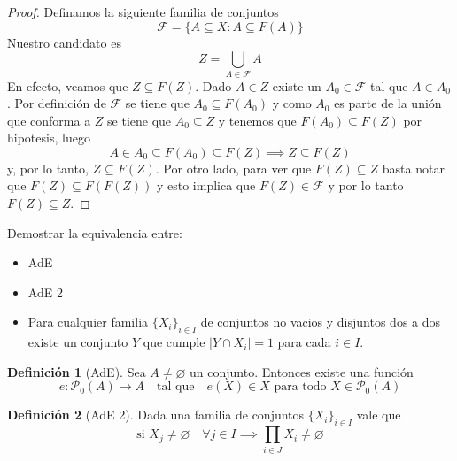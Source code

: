 \documentclass{article}
\theoremstyle{definition}
\newtheorem{definition}{Definición}[section]
\newenvironment{ejercicio}[1]{\begin{trivlist}
\item[\hskip \labelsep {\bfseries Ejercicio}\hskip \labelsep {\bfseries #1.}]}{\end{trivlist}}
\begin{document}
\begin{proof}
    Definamos la siguiente familia de conjuntos \[
        \mathcal{F} = \{ A \subseteq X : A \subseteq F(A) \}
    \]
    Nuestro candidato es \[
        Z = \bigcup_{A \in \mathcal{F}} A
    \]
    En efecto, veamos que \( Z \subseteq F(Z) \). Dado \( A \in Z \) existe un \( A_0 \in \mathcal{F} \) tal que \( A \in A_0 \). Por definición de \( \mathcal{F} \) se tiene que \( A_0 \subseteq F(A_0) \) y
    como \( A_0 \) es parte de la unión que conforma a \( Z \) se tiene que \( A_0 \subseteq Z \) y tenemos que \( F(A_0) \subseteq F(Z) \) por hipotesis, luego \[
        A \in A_0 \subseteq F(A_0) \subseteq F(Z) \implies Z \subseteq F(Z)
    \]
    y, por lo tanto, \( Z \subseteq F(Z) \).
    Por otro lado, para ver que \( F(Z) \subseteq Z \) basta notar que \( F(Z) \subseteq F(F(Z)) \) y esto implica que \( F(Z) \in \mathcal{F} \) y por lo tanto \( F(Z) \subseteq Z \).
\end{proof}

\begin{ejercicio}{7}
    Demostrar la equivalencia entre:
    \begin{itemize}
        \item AdE
        \item AdE 2
        \item Para cualquier familia \( {\{X_{i}\}}_{i\in I}\) de conjuntos no vacios y disjuntos dos a dos existe un conjunto \(Y\) que cumple \(|Y\cap X_{i}|=1\) para cada \(i\in I\).
    \end{itemize}
\end{ejercicio}

\begin{definition}[AdE]
    Sea \( A \neq \varnothing \) un conjunto. Entonces existe una función \[
        e: \mathcal{P}_0(A) \to A \quad \text{tal que} \quad e(X) \in X \text{ para todo } X \in \mathcal{P}_0(A)
    \]
\end{definition}

\begin{definition}[AdE 2]
    Dada una familia de conjuntos \( {\{ X_i \}}_{i \in I} \) vale que \[
        \text{si } X_j \neq \varnothing \quad \forall j \in I \implies \prod_{i \in J} X_i \neq \varnothing
    \]
\end{definition}
\end{document}
